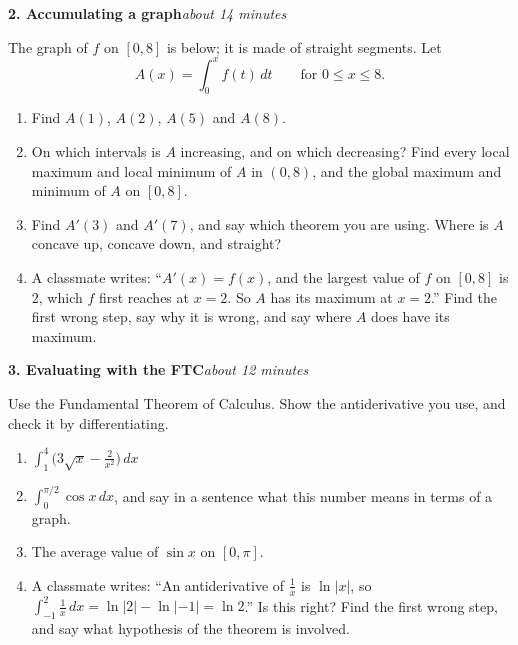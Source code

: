 \documentclass[11pt]{article}
\newcommand{\gridxy}[4]{%
  \foreach \gX in {#1,...,#2} \draw[gray!25] (\gX,#3) -- (\gX,#4);
  \foreach \gY in {#3,...,#4} \draw[gray!25] (#1,\gY) -- (#2,\gY);}
\newcommand{\prob}[2]{\medskip\noindent\textbf{\large #1}\hfill\textit{#2}\par\smallskip}
\begin{document}
\prob{2. Accumulating a graph}{about 14 minutes}
The graph of $f$ on $[0,8]$ is below; it is made of straight segments. Let
\[A(x)=\int_0^xf(t)\,dt\qquad\text{for }0\le x\le8.\]
\begin{center}
\end{center}
\begin{enumerate}
\item Find $A(1)$, $A(2)$, $A(5)$ and $A(8)$.
\item On which intervals is $A$ increasing, and on which decreasing? Find every local maximum
and local minimum of $A$ in $(0,8)$, and the global maximum and minimum of $A$ on $[0,8]$.
\item Find $A'(3)$ and $A'(7)$, and say which theorem you are using. Where is $A$ concave up,
concave down, and straight?
\item A classmate writes: ``$A'(x)=f(x)$, and the largest value of $f$ on $[0,8]$ is $2$,
which $f$ first reaches at $x=2$. So $A$ has its maximum at $x=2$.'' Find the first wrong
step, say why it is wrong, and say where $A$ does have its maximum.
\end{enumerate}

\prob{3. Evaluating with the FTC}{about 12 minutes}
Use the Fundamental Theorem of Calculus. Show the antiderivative you use, and check it
by differentiating.
\begin{enumerate}
\item $\displaystyle\int_1^4\Big(3\sqrt x-\frac2{x^2}\Big)\,dx$
\item $\displaystyle\int_0^{\pi/2}\cos x\,dx$, and say in a sentence what this number means
in terms of a graph.
\item The average value of $\sin x$ on $[0,\pi]$.
\item A classmate writes: ``An antiderivative of $\frac1x$ is $\ln|x|$, so
$\int_{-1}^{2}\frac1x\,dx=\ln|2|-\ln|-1|=\ln2$.'' Is this right? Find the first wrong
step, and say what hypothesis of the theorem is involved.
\end{enumerate}
\end{document}
